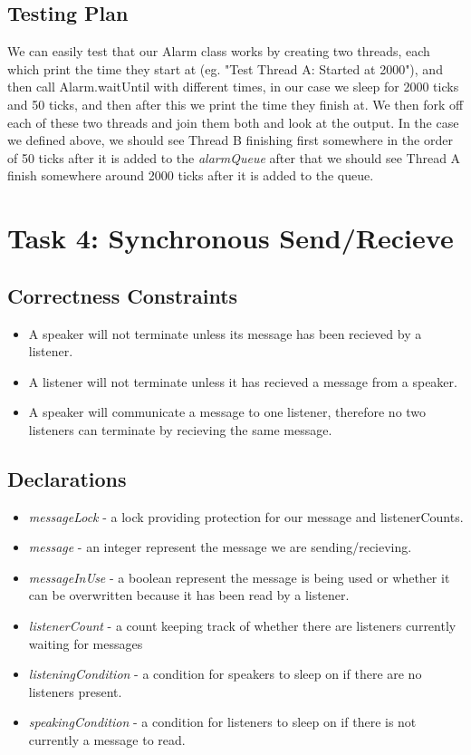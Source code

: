\documentclass{article}
\begin{document}
\subsection*{Testing Plan}

We can easily test that our Alarm class works by creating two threads, each which print the time they start at
(eg. "Test Thread A: Started at 2000"), and then call Alarm.waitUntil with different times, in our case we sleep
for 2000 ticks and 50 ticks, and then after this we print the time they finish at. We then fork off each of these
two threads and join them both and look at the output. In the case we defined above, we should see Thread B finishing
first somewhere in the order of 50 ticks after it is added to the \textit{alarmQueue} after that we should see
Thread A finish somewhere around 2000 ticks after it is added to the queue.

\section*{Task 4: Synchronous Send/Recieve}

\subsection*{Correctness Constraints}
\begin{itemize}
\item A speaker will not terminate unless its message has been recieved by a listener.
\item A listener will not terminate unless it has recieved a message from a speaker.
\item A speaker will communicate a message to one listener, therefore no two listeners can terminate by
recieving the same message.
\end{itemize}

\subsection*{Declarations}
\begin{itemize}
\item \textit{messageLock} - a lock providing protection for our message and listenerCounts.
\item \textit{message} - an integer represent the message we are sending/recieving.
\item \textit{messageInUse} - a boolean represent the message is being used or whether it can be overwritten because
it has been read by a listener.
\item \textit{listenerCount} - a count keeping track of whether there are listeners currently waiting for messages
\item \textit{listeningCondition} - a condition for speakers to sleep on if there are no listeners present.
\item \textit{speakingCondition} - a condition for listeners to sleep on if there is not currently a message to read.
\end{itemize}
\end{document}
